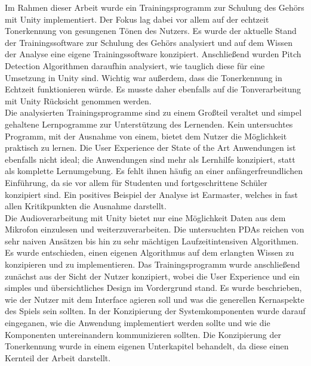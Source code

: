Im Rahmen dieser Arbeit wurde ein Trainingsprogramm zur Schulung des Gehörs mit Unity implementiert. Der Fokus lag dabei vor allem auf der echtzeit Tonerkennung von gesungenen Tönen des Nutzers. Es wurde der aktuelle Stand der Trainingssoftware zur Schulung des Gehörs analysiert und auf dem Wissen der Analyse eine eigene Trainingssoftware konzipiert. Anschließend wurden Pitch Detection Algorithmen daraufhin analysiert, wie tauglich diese für eine Umsetzung in Unity sind. Wichtig war außerdem, dass die Tonerkennung in Echtzeit funktionieren würde. Es musste daher ebenfalls auf die Tonverarbeitung mit Unity Rücksicht genommen werden. \\
Die analysierten Trainingsprogramme sind zu einem Großteil veraltet und simpel gehaltene Lernpogramme zur Unterstützung des Lernenden. Kein untersuchtes Programm, mit der Ausnahme von einem, bietet dem Nutzer die Möglichkeit praktisch zu lernen. Die User Experience der State of the Art Anwendungen ist ebenfalls nicht ideal; die Anwendungen sind mehr als Lernhilfe konzipiert, statt als komplette Lernumgebung. Es fehlt ihnen häufig an einer anfängerfreundlichen Einführung, da sie vor allem für Studenten und fortgeschrittene Schüler konzipiert sind. Ein positives Beispiel der Analyse ist Earmaster, welches in fast allen Kritikpunkten die Ausnahme darstellt. \\
Die Audioverarbeitung mit Unity bietet nur eine Möglichkeit Daten aus dem Mikrofon einzulesen und weiterzuverarbeiten. Die untersuchten PDAs reichen von sehr naiven Ansätzen bis hin zu sehr mächtigen Laufzeitintensiven Algorithmen. Es wurde entschieden, einen eigenen Algorithmus auf dem erlangten Wissen zu konzipieren und zu implementieren. Das Trainingsprogramm wurde anschließend zunächst aus der Sicht der Nutzer konzipiert, wobei die User Experience und ein simples und übersichtliches Design im Vordergrund stand. Es wurde beschrieben, wie der Nutzer mit dem Interface agieren soll und was die generellen Kernaspekte des Spiels sein sollten. In der Konzipierung der Systemkomponenten wurde darauf eingeganen, wie die Anwendung implementiert werden sollte und wie die Komponenten untereinandern kommunizieren sollten. Die Konzipierung der Tonerkennung wurde in einem eigenen Unterkapitel behandelt, da diese einen Kernteil der Arbeit darstellt. \\
